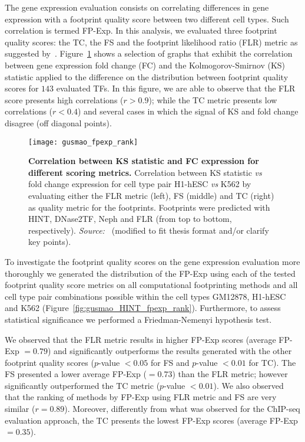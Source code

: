 The gene expression evaluation consists on correlating differences in gene expression with a footprint quality score between two different cell types. Such correlation is termed FP-Exp. In this analysis, we evaluated three footprint quality scores: the TC, the FS and the footprint likelihood ratio (FLR) metric as suggested by~\cite{yardimci2014}. Figure~\ref{fig:gusmao_fpexp_rank} shows a selection of graphs that exhibit the correlation between gene expression fold change (FC) and the Kolmogorov-Smirnov (KS) statistic applied to the difference on the distribution between footprint quality scores for $143$ evaluated TFs. In this figure, we are able to observe that the FLR score presents high correlations ($r > 0.9$); while the TC metric presents low correlations ($r < 0.4$) and several cases in which the signal of KS and fold change disagree (off diagonal points).

\begin{figure}[h!]
\centering
\texttt{[image: gusmao\_fpexp\_rank]}
\caption[Correlation between KS statistic and FC expression for different scoring metrics]{\textbf{Correlation between KS statistic and FC expression for different scoring metrics.} Correlation between KS statistic \textit{vs} fold change expression for cell type pair H1-hESC \textit{vs} K562 by evaluating either the FLR metric (left), FS (middle) and TC (right) as quality metric for the footprints. Footprints were predicted with HINT, DNase2TF, Neph and FLR (from top to bottom, respectively). \emph{Source:~\cite{gusmao2016}} (modified to fit thesis format and/or clarify key points).}
\label{fig:gusmao_fpexp_rank}
\end{figure}

To investigate the footprint quality scores on the gene expression evaluation more thoroughly we generated the distribution of the FP-Exp using each of the tested footprint quality score metrics on all computational footprinting methods and all cell type pair combinations possible within the cell types GM12878, H1-hESC and K562 (Figure~\ref{fig:gusmao_HINT_fpexp_rank}). Furthermore, to assess statistical significance we performed a Friedman-Nemenyi hypothesis test.

We observed that the FLR metric results in higher FP-Exp scores (average FP-Exp $= 0.79$) and significantly outperforms the results generated with the other footprint quality scores ($p$-value $< 0.05$ for FS and $p$-value $< 0.01$ for TC). The FS presented a lower average FP-Exp ($= 0.73$) than the FLR metric; however significantly outperformed the TC metric ($p$-value $< 0.01$). We also observed that the ranking of methods by FP-Exp using FLR metric and FS are very similar ($r=0.89$). Moreover, differently from what was observed for the ChIP-seq evaluation approach, the TC presents the lowest FP-Exp scores (average FP-Exp $= 0.35$).

